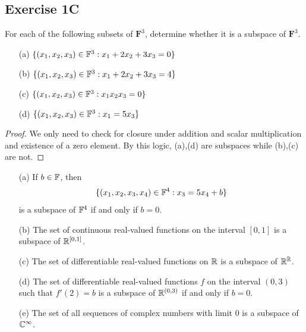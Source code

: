 \subsection{Exercise 1C}
\begin{question}
	For each of the following subsets of $\mathbf{F}^3$, determine whether it is a subspace of $\mathbf{F}^3$.
	\begin{enumerate}
		\item[(a)] $\{(x_1, x_2, x_3) \in \mathbb{F}^3 : x_1 + 2x_2 + 3x_3 = 0\}$
		\item[(b)] $\{(x_1, x_2, x_3) \in \mathbb{F}^3 : x_1 + 2x_2 + 3x_3 = 4\}$
		\item[(c)] $\{(x_1, x_2, x_3) \in \mathbb{F}^3 : x_1 x_2 x_3 = 0\}$
		\item[(d)] $\{(x_1, x_2, x_3) \in \mathbb{F}^3 : x_1 = 5x_3\}$
	\end{enumerate}
\end{question}
\begin{proof}
	We only need to check for closure under addition and scalar multiplication and existence of a zero element. By this logic, (a),(d) are subspaces while (b),(c) are not.
\end{proof}
\begin{question}
	\begin{enumerate}
		Verify all assertions about subspaces below
		\item[(a)] If $b \in \mathbb{F}$, then
		\[ \{(x_1, x_2, x_3, x_4) \in \mathbb{F}^4 : x_3 = 5x_4 + b\} \]
		is a subspace of $\mathbb{F}^4$ if and only if $b = 0$.
		
		\item[(b)] The set of continuous real-valued functions on the interval $[0, 1]$ is a subspace of $\mathbb{R}^{[0, 1]}$.
		
		\item[(c)] The set of differentiable real-valued functions on $\mathbb{R}$ is a subspace of $\mathbb{R}^{\mathbb{R}}$.
		
		\item[(d)] The set of differentiable real-valued functions $f$ on the interval $(0, 3)$ such that $f'(2) = b$ is a subspace of $\mathbb{R}^{(0, 3)}$ if and only if $b = 0$.
		
		\item[(e)] The set of all sequences of complex numbers with limit $0$ is a subspace of $\mathbb{C}^\infty$.
	\end{enumerate}
\end{question}
